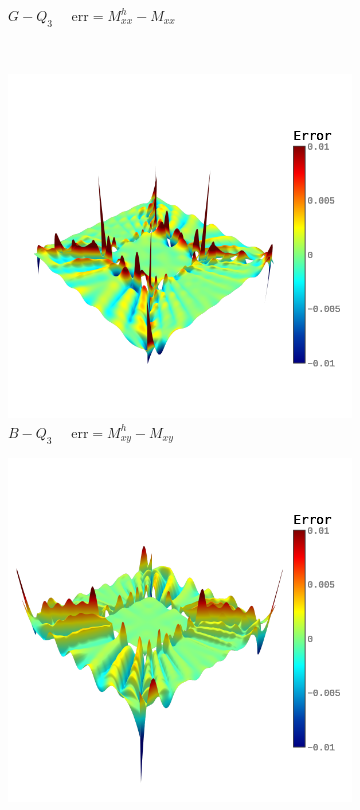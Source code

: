 \begin{figure}[H]
\begin{subfigure}[t]{.45\linewidth}
		\caption{$G-Q_3$ $\quad \text{err} = M_{xx}^h-M_{xx}$}
	\end{subfigure}\\
	\begin{subfigure}[t]{.45\linewidth}
		\center
		\includegraphics[scale=.3,trim={0cm 1.5cm 0cm 1.5cm},clip]{e_Mxy}
		\caption{$B-Q_3$ $\quad \text{err} = M_{xy}^h-M_{xy}$}
	\end{subfigure}
	\begin{subfigure}[t]{.45\linewidth}
		\center
		\includegraphics[scale=.3,trim={0cm 1.5cm 0cm 1.5cm},clip]{g_Mxy}

\end{subfigure}
\end{figure}
